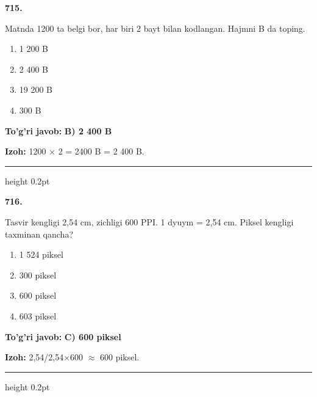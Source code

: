 \documentclass[10pt,a4paper,oneside]{article}
\begin{document}
\noindent\textbf{\color{ink}715.}
\par
Matnda 1200 ta belgi bor, har biri 2 bayt bilan kodlangan. Hajmni B da toping.
\begin{enumerate}[label=\Alph*),leftmargin=9mm]
\item 1 200 B
\item 2 400 B
\item 19 200 B
\item 300 B
\end{enumerate}
\begin{tcolorbox}[enhanced,breakable,colback=teal!4,colframe=teal!50!black,boxrule=0.5pt,arc=1.1mm,left=3mm,right=3mm,top=1.7mm,bottom=1.7mm,before skip=2mm,after skip=2mm]
\textbf{\color{teal}To'g'ri javob:} \textbf{B) 2 400 B}
\par\smallskip
\textbf{Izoh:} 1200 \ensuremath{\times} 2 = 2400 B = 2 400 B.
\end{tcolorbox}
\vspace{2mm}\hrule height 0.2pt \vspace{3mm}

\noindent\textbf{\color{ink}716.}
\par
Tasvir kengligi 2,54 cm, zichligi 600 PPI. 1 dyuym = 2,54 cm. Piksel kengligi taxminan qancha?
\begin{enumerate}[label=\Alph*),leftmargin=9mm]
\item 1 524 piksel
\item 300 piksel
\item 600 piksel
\item 603 piksel
\end{enumerate}
\begin{tcolorbox}[enhanced,breakable,colback=teal!4,colframe=teal!50!black,boxrule=0.5pt,arc=1.1mm,left=3mm,right=3mm,top=1.7mm,bottom=1.7mm,before skip=2mm,after skip=2mm]
\textbf{\color{teal}To'g'ri javob:} \textbf{C) 600 piksel}
\par\smallskip
\textbf{Izoh:} 2,54/2,54\ensuremath{\times}600 \ensuremath{\approx} 600 piksel.
\end{tcolorbox}
\vspace{2mm}\hrule height 0.2pt \vspace{3mm}
\end{document}
